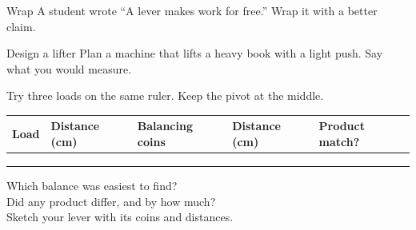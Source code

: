 \begin{puzzle}{Wrap}
A student wrote ``A lever makes work for free.'' Wrap it with a better claim. \wline[6cm]
\end{puzzle}

\begin{puzzle}{Design a lifter}
Plan a machine that lifts a heavy book with a light push. Say what you would measure. \wline[6cm]
\end{puzzle}
\clearpage

\thispagestyle{fancy}
Try three loads on the same ruler. Keep the pivot at the middle.\par\medskip
\renewcommand{\arraystretch}{3.0}
\begin{tabularx}{\linewidth}{|>{\sffamily\small\bfseries}p{2.6cm}|X|X|X|X|}
\hline
Load & Distance (cm) & Balancing coins & Distance (cm) & Product match? \\ \hline
 & & & & \\ \hline
 & & & & \\ \hline
 & & & & \\ \hline
\end{tabularx}

\vspace{8pt}
Which balance was easiest to find? \wline[7cm]\\[10pt]
Did any product differ, and by how much? \wline[5cm]\\[10pt]
Sketch your lever with its coins and distances.\par\medskip
{}
\clearpage
